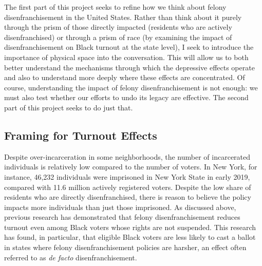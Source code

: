\documentclass[
  12pt,
]{article}
\begin{document}
The first part of this project seeks to refine how we think about felony disenfranchisement in the United States. Rather than think about it purely through the prism of those directly impacted (residents who are actively disenfranchised) or through a prism of race (by examining the impact of disenfranchisement on Black turnout at the state level), I seek to introduce the importance of physical space into the conversation. This will allow us to both better understand the mechanisms through which the depressive effects operate and also to understand more deeply where these effects are concentrated. Of course, understanding the impact of felony disenfranchisement is not enough: we must also test whether our efforts to undo its legacy are effective. The second part of this project seeks to do just that.

\hypertarget{framing-for-turnout-effects}{%
\subsection*{Framing for Turnout Effects}\label{framing-for-turnout-effects}}

Despite over-incarceration in some neighborhoods, the number of incarcerated individuals is relatively low compared to the number of voters. In New York, for instance, 46,232 individuals were imprisoned in New York State in early 2019, compared with 11.6 million actively registered voters. Despite the low share of residents who are directly disenfranchised, there is reason to believe the policy impacts more individuals than just those imprisoned. As discussed above, previous research has demonstrated that felony disenfranchisement reduces turnout even among Black voters whose rights are not suspended. This research has found, in particular, that eligible Black voters are less likely to cast a ballot in states where felony disenfranchisement policies are harsher, an effect often referred to as \emph{de facto} disenfranchisement.
\end{document}
